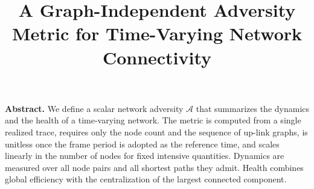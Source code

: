\documentclass[10pt,a4paper]{article}
\title{\vspace{-1.5em}\textbf{A Graph-Independent Adversity Metric for Time-Varying Network Connectivity}\vspace{-1.5em}}
\author{}
\date{}
\begin{document}
\maketitle

\textbf{Abstract.} We define a scalar network adversity $\mathcal{A}$ that summarizes the dynamics and the health of a time-varying network. The metric is computed from a single realized trace, requires only the node count and the sequence of up-link graphs, is unitless once the frame period is adopted as the reference time, and scales linearly in the number of nodes for fixed intensive quantities. Dynamics are measured over all node pairs and all shortest paths they admit. Health combines global efficiency with the centralization of the largest connected component.

\end{document}

